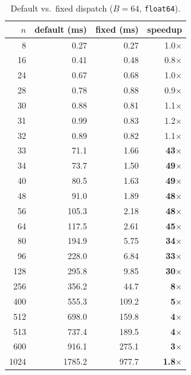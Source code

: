 \documentclass[10pt, letterpaper]{article}
\begin{document}
\begin{table}[h]
\centering
\caption{Default vs.\ fixed dispatch ($B = 64$, \texttt{float64}).}
\label{tab:f64_B64}
\begin{tabular}{r rrr}
\toprule
$n$ & default (ms) & fixed (ms) & speedup \\
\midrule
     8  &    0.27 &    0.27 & 1.0$\times$ \\
    16  &    0.41 &    0.48 & 0.8$\times$ \\
    24  &    0.67 &    0.68 & 1.0$\times$ \\
    28  &    0.78 &    0.88 & 0.9$\times$ \\
    30  &    0.88 &    0.81 & 1.1$\times$ \\
    31  &    0.99 &    0.83 & 1.2$\times$ \\
    32  &    0.89 &    0.82 & 1.1$\times$ \\
\midrule
    33  &    71.1 &    1.66 & \textbf{43$\times$} \\
    34  &    73.7 &    1.50 & \textbf{49$\times$} \\
    40  &    80.5 &    1.63 & \textbf{49$\times$} \\
    48  &    91.0 &    1.89 & \textbf{48$\times$} \\
    56  &   105.3 &    2.18 & \textbf{48$\times$} \\
    64  &   117.5 &    2.61 & \textbf{45$\times$} \\
    80  &   194.9 &    5.75 & \textbf{34$\times$} \\
    96  &   228.0 &    6.84 & \textbf{33$\times$} \\
   128  &   295.8 &    9.85 & \textbf{30$\times$} \\
   256  &   356.2 &    44.7 & \textbf{8$\times$} \\
   400  &   555.3 &   109.2 & \textbf{5$\times$} \\
   512  &   698.0 &   159.8 & \textbf{4$\times$} \\
   513  &   737.4 &   189.5 & \textbf{4$\times$} \\
   600  &   916.1 &   275.1 & \textbf{3$\times$} \\
  1024  &  1785.2 &   977.7 & \textbf{1.8$\times$} \\
\bottomrule
\end{tabular}
\end{table}
\end{document}
